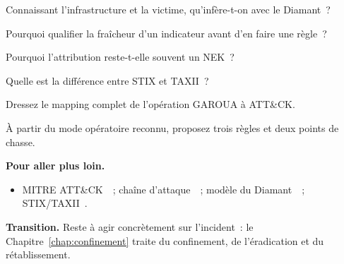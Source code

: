\begin{boxexo}[title={\ding{45}\quad Exercice~17.5. Inférer \niveaumoyen}]
Connaissant l'infrastructure et la victime, qu'infère-t-on avec le Diamant~?
\end{boxexo}

\begin{boxexo}[title={\ding{45}\quad Exercice~17.6. Indicateur périmé \niveaumoyen}]
Pourquoi qualifier la fraîcheur d'un indicateur avant d'en faire une règle~?
\end{boxexo}

\begin{boxexo}[title={\ding{45}\quad Exercice~17.7. Attribution \niveaumoyen}]
Pourquoi l'attribution reste-t-elle souvent un NEK~?
\end{boxexo}

\begin{boxexo}[title={\ding{45}\quad Exercice~17.8. STIX/TAXII \niveaumoyen}]
Quelle est la différence entre STIX et TAXII~?
\end{boxexo}

\begin{boxexo}[title={\ding{45}\quad Exercice~17.9. Mapping complet \niveauexpert}]
Dressez le mapping complet de l'opération GAROUA à ATT\&CK.
\end{boxexo}

\begin{boxexo}[title={\ding{45}\quad Exercice~17.10. Du renseignement aux règles \niveauexpert}]
À partir du mode opératoire reconnu, proposez trois règles et deux points de
chasse.
\end{boxexo}

\bigskip

\begin{boxinfo}
\textbf{Pour aller plus loin.}
\begin{itemize}
    \item MITRE ATT\&CK~\cite{mitreattack}~; chaîne d'attaque~\cite{killchain2011}~;
          modèle du Diamant~\cite{diamond2013}~; STIX/TAXII~\cite{stixtaxii}.
\end{itemize}
\end{boxinfo}

\begin{boxinfo}
\textbf{Transition.} Reste à agir concrètement sur l'incident~: le
Chapitre~\ref{chap:confinement} traite du confinement, de l'éradication et du
rétablissement.
\end{boxinfo}
